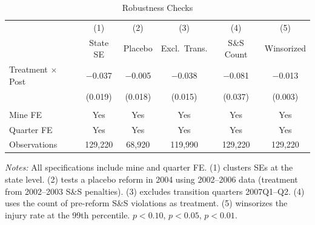 \begin{table}[H]
\centering
\caption{Robustness Checks}
\label{tab:robustness}
\small
\begin{tabular}{lccccc}
\toprule
 & (1) & (2) & (3) & (4) & (5) \\
 & State SE & Placebo & Excl.\ Trans. & S\&S Count & Winsorized \\
\midrule
Treatment $\times$ Post & $-$0.037\sym{*} & $-$0.005 & $-$0.038\sym{**} & $-$0.081\sym{**} & $-$0.013\sym{***} \\
 & (0.019) & (0.018) & (0.015) & (0.037) & (0.003) \\
\\
Mine FE & Yes & Yes & Yes & Yes & Yes \\
Quarter FE & Yes & Yes & Yes & Yes & Yes \\
Observations & 129,220 & 68,920 & 119,990 & 129,220 & 129,220 \\
\bottomrule
\end{tabular}
\par\vspace{0.3em}
{\footnotesize \textit{Notes:} All specifications include mine and quarter FE. (1) clusters SEs at the state level. (2) tests a placebo reform in 2004 using 2002--2006 data (treatment from 2002--2003 S\&S penalties). (3) excludes transition quarters 2007Q1--Q2. (4) uses the count of pre-reform S\&S violations as treatment. (5) winsorizes the injury rate at the 99th percentile. \sym{*} $p<0.10$, \sym{**} $p<0.05$, \sym{***} $p<0.01$.}
\end{table}
